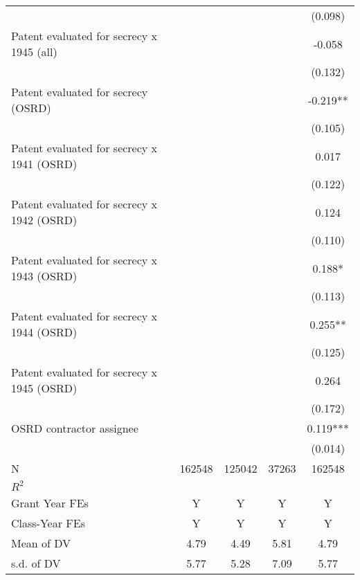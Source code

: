 {\begin{tabular}{l*{4}{c}}
                        &               &               &               &     (0.098)   \\
Patent evaluated for secrecy x 1945 (all)&               &               &               &      -0.058   \\
                        &               &               &               &     (0.132)   \\
Patent evaluated for secrecy (OSRD)&               &               &               &      -0.219** \\
                        &               &               &               &     (0.105)   \\
Patent evaluated for secrecy x 1941 (OSRD)&               &               &               &       0.017   \\
                        &               &               &               &     (0.122)   \\
Patent evaluated for secrecy x 1942 (OSRD)&               &               &               &       0.124   \\
                        &               &               &               &     (0.110)   \\
Patent evaluated for secrecy x 1943 (OSRD)&               &               &               &       0.188*  \\
                        &               &               &               &     (0.113)   \\
Patent evaluated for secrecy x 1944 (OSRD)&               &               &               &       0.255** \\
                        &               &               &               &     (0.125)   \\
Patent evaluated for secrecy x 1945 (OSRD)&               &               &               &       0.264   \\
                        &               &               &               &     (0.172)   \\
OSRD contractor assignee&               &               &               &       0.119***\\
                        &               &               &               &     (0.014)   \\
\hline
N                       &      162548   &      125042   &       37263   &      162548   \\
$R^2$                   &               &               &               &               \\
Grant Year FEs          &           Y   &           Y   &           Y   &           Y   \\
Class-Year FEs          &           Y   &           Y   &           Y   &           Y   \\
Mean of DV              &        4.79   &        4.49   &        5.81   &        4.79   \\
s.d. of DV              &        5.77   &        5.28   &        7.09   &        5.77   \\
\hline\hline
\end{tabular}
}
